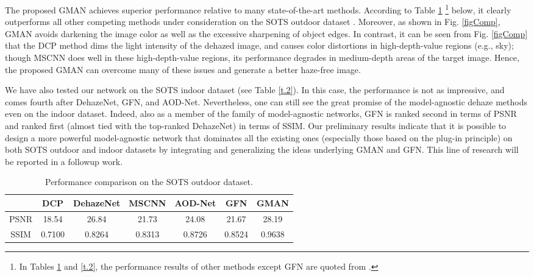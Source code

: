 \documentclass[journal]{IEEEtran}
\begin{document}
The proposed GMAN achieves superior performance relative to many state-of-the-art methods. According to Table \ref{t.1} \footnote{In Tables \ref{t.1} and \ref{t.2}, the performance results of other methods except GFN are quoted from \cite{li2017reside}.} below, it clearly outperforms all other competing methods under consideration on the SOTS outdoor dataset \cite{DarkChanPrior,DehazeNet,MultiScaleCNN,AllInOne}.  Moreover, as shown in Fig. \ref{figComp}, GMAN avoids darkening the image color  as well as the excessive sharpening of object edges. In contrast, it can be seen from Fig. \ref{figComp} that the DCP  method \cite{DarkChanPrior} dims the light intensity of the dehazed image, and causes color distortions in high-depth-value regions (e.g., sky); though MSCNN \cite{MultiScaleCNN} does well in these high-depth-value regions, its performance degrades in medium-depth areas of the target image. Hence, the proposed GMAN can overcome many of these issues and generate a better haze-free image.


We have also tested our network on the SOTS indoor dataset (see Table \ref{t.2}). In this case, the performance is not as impressive, and comes fourth after DehazeNet, GFN, and AOD-Net. Nevertheless, one can still see the great promise of the model-agnostic dehaze methods even on the indoor dataset. Indeed, also as a member of the family of model-agnostic networks, GFN is ranked second in terms of PSNR and ranked first (almost tied with the top-ranked DehazeNet) in terms of SSIM. Our preliminary results indicate that it is possible to design a more powerful model-agnostic network  that dominates all the existing ones (especially those based on the plug-in principle) on both SOTS outdoor and indoor datasets by integrating and generalizing the ideas underlying GMAN and GFN. This line of research will be reported in a followup work.

\begin{table}[!htbp]
	\centering
	\caption{Performance comparison on the SOTS outdoor dataset.}
	\begin{tabular}{ccccccc}
		\hline
		&DCP &DehazeNet &MSCNN &AOD-Net &GFN &GMAN\\ \hline
		PSNR &18.54 &26.84 &21.73 &24.08 &21.67 &28.19\\
		SSIM &0.7100 &0.8264 &0.8313 &0.8726 &0.8524 &0.9638\\ \hline
	\end{tabular}
	\label{t.1}
\end{table}
\end{document}
